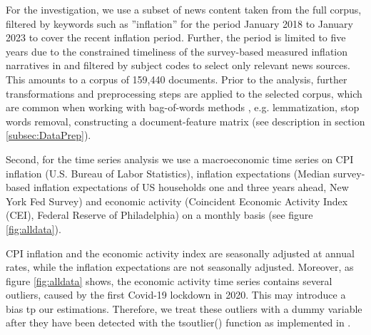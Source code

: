 For the investigation, we use a subset of news content taken from the full corpus, filtered by keywords such as ''inflation'' for the period January 2018 to January 2023 to cover the recent inflation period. Further, the period is limited to five years due to the constrained timeliness of the survey-based measured inflation narratives in \cite{Andre.2023} and filtered by subject codes to select only relevant news sources. This amounts to a corpus of 159,440 documents. Prior to the analysis, further transformations and preprocessing steps are applied to the selected corpus, which are common when working with bag-of-words methods \citep{grimmer.2022}, e.g. lemmatization, stop words removal, constructing a document-feature matrix (see description in section \ref{subsec:DataPrep}).

Second, for the time series analysis we use a macroeconomic time series on CPI inflation (U.S. Bureau of Labor Statistics), inflation expectations (Median survey-based inflation expectations of US households one and three years ahead, New York Fed Survey) and economic activity (Coincident Economic Activity Index (CEI), Federal Reserve of Philadelphia) on a monthly basis (see figure \ref{fig:alldata}). 

CPI inflation and the economic activity index are seasonally adjusted at annual rates, while the inflation expectations are not seasonally adjusted. Moreover, as figure \ref{fig:alldata} shows, the economic activity time series contains several outliers, caused by the first Covid-19 lockdown in 2020. This may introduce a bias tp our estimations. Therefore, we treat these outliers with a dummy variable after they have been detected with the \textsf{tsoutlier()} function as implemented in \cite{forecast.2022}.

%	
%	

